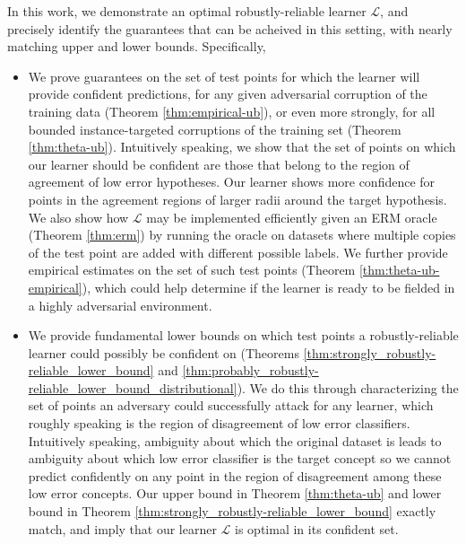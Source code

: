 \documentclass[11pt]{article}
\newcommand{\0}{\mathbf{0}}
\newcommand{\1}{\mathbf{1}}
\newcommand{\cL}{\mathcal{L}}
\begin{document}
In this work, we demonstrate an optimal robustly-reliable learner $\cL$, and precisely identify the guarantees that can be acheived in this setting, with nearly matching  upper and lower bounds. Specifically,



\begin{itemize}[leftmargin=*] \itemsep -1pt
\item We prove guarantees on the set of test points for which the learner will provide confident predictions, for any given adversarial corruption of the training data (Theorem \ref{thm:empirical-ub}), or even more strongly, for all bounded instance-targeted corruptions of the training set (Theorem \ref{thm:theta-ub}). Intuitively speaking, we show that the set of points on which our learner should be confident are those that belong to the region of agreement of low error hypotheses.   Our learner shows more confidence for points in the agreement regions of larger radii around the target hypothesis. We also show how $\cL$ may be implemented efficiently given an ERM oracle (Theorem \ref{thm:erm}) by running the oracle on datasets where multiple copies of the test point are added with different possible labels. We further provide empirical estimates on the set of such test points (Theorem \ref{thm:theta-ub-empirical}), which could help determine if the learner is ready to be fielded in a highly adversarial environment.


\item We provide fundamental lower bounds on which test points a robustly-reliable learner could possibly be confident on (Theorems \ref{thm:strongly_robustly-reliable_lower_bound} and \ref{thm:probably_robustly-reliable_lower_bound_distributional}). We do this through characterizing the set of points an adversary could successfully attack for any learner, which roughly speaking is the region of disagreement of low error classifiers. Intuitively speaking, ambiguity about which the original dataset is leads to ambiguity about which low error classifier is the target concept so we cannot predict confidently on any point in the region of disagreement among these low error concepts.
Our upper bound in Theorem \ref{thm:theta-ub} and lower bound in Theorem \ref{thm:strongly_robustly-reliable_lower_bound} exactly match, and imply that our learner $\cL$ is optimal in its confident set. 



\end{itemize}
\end{document}
